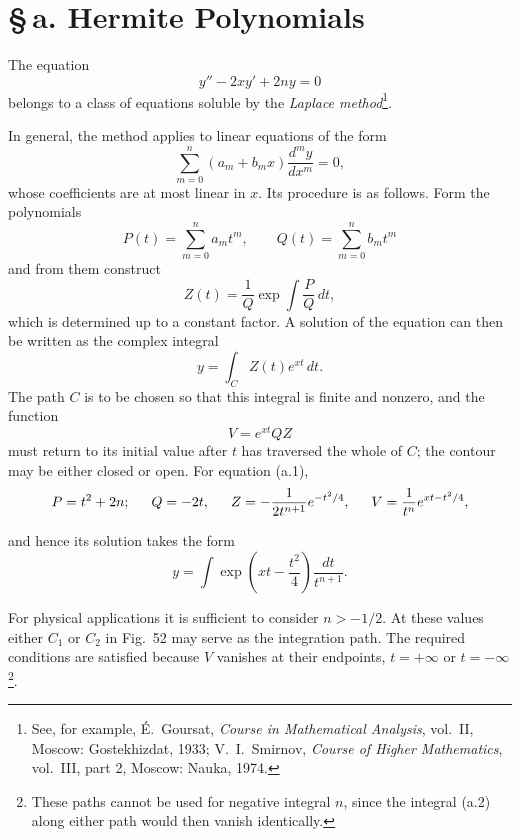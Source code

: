 \section*{\S\,a. Hermite Polynomials}
\setcounter{figure}{51}

The equation
\begin{equation}
 y''-2xy'+2ny=0
 \tag{a.1}
\end{equation}
belongs to a class of equations soluble by the \emph{Laplace
method}\footnote{See, for example, É.~Goursat, \emph{Course in Mathematical
Analysis}, vol.~II, Moscow: Gostekhizdat, 1933; V.~I.~Smirnov, \emph{Course of
Higher Mathematics}, vol.~III, part 2, Moscow: Nauka, 1974.}.

In general, the method applies to linear equations of the form
\[
 \sum_{m=0}^{n}(a_m+b_mx)\frac{d^my}{dx^m}=0,
\]
whose coefficients are at most linear in $x$. Its procedure is as follows.
Form the polynomials
\[
 P(t)=\sum_{m=0}^{n}a_mt^m,\hspace{2em}
 Q(t)=\sum_{m=0}^{n}b_mt^m
\]
and from them construct
\[
 Z(t)=\frac1Q\exp\int\frac PQ\,dt,
\]
which is determined up to a constant factor. A solution of the equation can
then be written as the complex integral
\[
 y=\int_C Z(t)e^{xt}\,dt.
\]
The path $C$ is to be chosen so that this integral is finite and nonzero, and
the function
\[
 V=e^{xt}QZ
\]
must return to its initial value after $t$ has traversed the whole of $C$; the
contour may be either closed or open. For equation (a.1),
\[
 P=t^2+2n;\hspace{1.5em} Q=-2t,\hspace{1.5em}
 Z=-\frac1{2t^{n+1}}e^{-t^2/4},\hspace{1.5em}
 V=\frac1{t^n}e^{xt-t^2/4},
\]

and hence its solution takes the form
\begin{equation}
 y=\int\exp\left(xt-\frac{t^2}{4}\right)\frac{dt}{t^{n+1}}.
 \tag{a.2}
\end{equation}

For physical applications it is sufficient to consider $n>-1/2$. At these
values either $C_1$ or $C_2$ in Fig.~52 may serve as the integration path. The
required conditions are satisfied because $V$ vanishes at their endpoints,
$t=+\infty$ or $t=-\infty$\footnote{These paths cannot be used for negative
integral $n$, since the integral (a.2) along either path would then vanish
identically.}.

